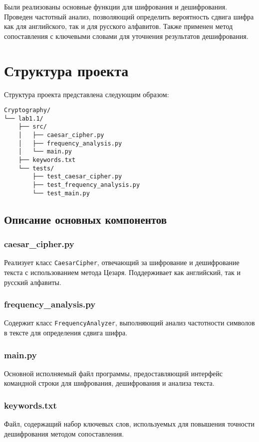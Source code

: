 \documentclass[a4paper, 14pt]{report}
\begin{document}
Были реализованы основные функции для шифрования и дешифрования. Проведен частотный анализ, позволяющий определить вероятность сдвига шифра как для английского, так и для русского алфавитов. Также применен метод сопоставления с ключевыми словами для уточнения результатов дешифрования.

\chapter{Структура проекта}
Структура проекта представлена следующим образом:

\begin{verbatim}
Cryptography/
└── lab1.1/
    ├── src/
    │   ├── caesar_cipher.py
    │   ├── frequency_analysis.py
    │   └── main.py
    ├── keywords.txt
    └── tests/
        ├── test_caesar_cipher.py
        ├── test_frequency_analysis.py
        └── test_main.py
\end{verbatim}

\section{Описание основных компонентов}
\subsection{caesar\_cipher.py}
Реализует класс \texttt{CaesarCipher}, отвечающий за шифрование и дешифрование текста с использованием метода Цезаря. Поддерживает как английский, так и русский алфавиты.

\subsection{frequency\_analysis.py}
Содержит класс \texttt{FrequencyAnalyzer}, выполняющий анализ частотности символов в тексте для определения сдвига шифра.

\subsection{main.py}
Основной исполняемый файл программы, предоставляющий интерфейс командной строки для шифрования, дешифрования и анализа текста.

\subsection{keywords.txt}
Файл, содержащий набор ключевых слов, используемых для повышения точности дешифрования методом сопоставления.
\end{document}
